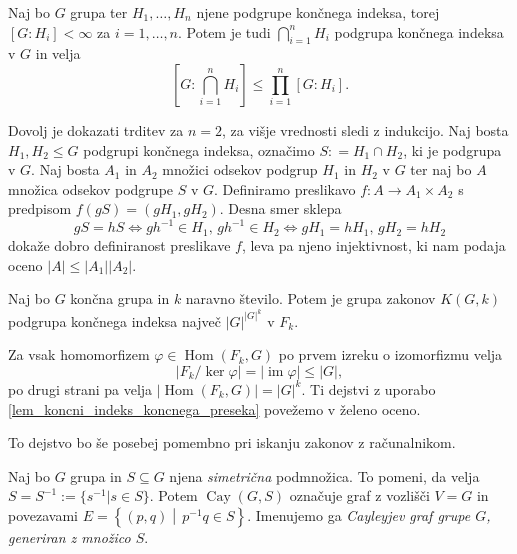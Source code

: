 \begin{lema}\label{lem_koncni_indeks_koncnega_preseka}
Naj bo $G$ grupa ter $H_1, \ldots, H_n$ njene podgrupe končnega indeksa, torej $[G: H_i] < \infty$ za $i = 1, \ldots, n$. Potem je tudi $\bigcap_{i = 1}^{n} H_i$ podgrupa končnega indeksa v $G$ in velja
\begin{equation*}
\left[ G: \bigcap_{i = 1}^{n} H_i \right]  \le \prod_{i=1}^{n} [G: H_i].  
\end{equation*} 
\end{lema}

\begin{dokaz}
Dovolj je dokazati trditev za $n = 2$, za višje vrednosti sledi z indukcijo. Naj bosta $H_1, H_2 \le G$ podgrupi končnega indeksa, označimo $S: = H_1 \cap H_2$, ki je podgrupa v $G$. Naj bosta $A_1$ in $A_2$ množici odsekov podgrup $H_1$ in $H_2$ v $G$ ter naj bo $A$ množica odsekov podgrupe $S$ v $G$.
 Definiramo preslikavo $f \colon A \to  A_1 \times A_2$ s predpisom $f(g S ) = (g H_1, g H_2)$. Desna smer sklepa \begin{equation*}
 g S = h S \iff gh^{-1} \in H_1, \, gh^{-1} \in H_2  \iff g H_1 = h H_1, \, g H_2 = h H_2
\end{equation*}  
dokaže dobro definiranost preslikave $f$, leva pa njeno injektivnost, ki nam podaja oceno $\lvert A \rvert \le  \lvert A_1 \rvert \lvert A_2 \rvert $.    
\end{dokaz}

\begin{posledica}
\label{psl_koncni_indeks_preseka}
Naj bo $G$ končna grupa in $k$ naravno število. Potem je grupa zakonov $K(G, k)$ podgrupa končnega indeksa največ $\lvert G \rvert^{ \lvert G \rvert^k}$ v $F_k$.
\end{posledica}
\begin{dokaz}
  Za vsak homomorfizem $\varphi \in \operatorname{Hom}(F_k, G)$ po prvem izreku o izomorfizmu velja \begin{equation*}
    \lvert F_k / \ker \varphi \rvert = \lvert \operatorname{im} \varphi \rvert \le \lvert G \rvert, 
\end{equation*}
po drugi strani pa velja $\lvert \operatorname{Hom}(F_k, G) \rvert = \lvert G \rvert^k$. Ti dejstvi z uporabo \ref{lem_koncni_indeks_koncnega_preseka} povežemo v želeno oceno.     %
\end{dokaz}
To dejstvo bo še posebej pomembno pri iskanju zakonov z računalnikom.

\begin{definicija}
\label{def_cayleyev_graf}
Naj bo $G$ grupa in $S \subseteq G$ njena \emph{simetrična} podmnožica. To pomeni, da velja $S = S^{-1} := \{ s^{-1}  \vert s \in S  \}$. Potem $\operatorname{Cay}(G, S)$ označuje graf z vozlišči $V = G$ in povezavami
$E = \left\{ (p, q) \middle|\, p^{-1}q \in  S \right\}$. Imenujemo ga \emph{Cayleyjev graf grupe $G$, generiran z množico $S$}.  
\end{definicija}

